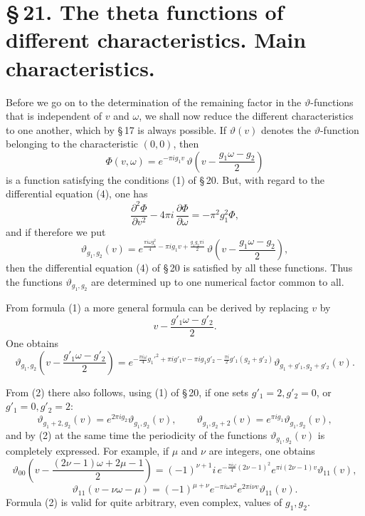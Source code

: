 \documentclass[11pt]{article}
\begin{document}
\section*{\S\,21. The theta functions of different characteristics. Main characteristics.}

Before we go on to the determination of the remaining factor in the $\vartheta$-functions that is independent of $v$ and $\omega$, we shall now reduce the different characteristics to one another, which by \S\,17 is always possible. If $\vartheta(v)$ denotes the $\vartheta$-function belonging to the characteristic $(0,0)$, then
\[
\Phi(v,\omega)=e^{-\pi i g_1 v}\,
\vartheta\!\left(v-\frac{g_1\omega-g_2}{2}\right)
\]
is a function satisfying the conditions (1) of \S\,20. But, with regard to the differential equation (4), one has
\[
\frac{\partial^2\Phi}{\partial v^2}-4\pi i\,\frac{\partial\Phi}{\partial\omega}
=-\pi^2g_1^2\Phi,
\]
and if therefore we put
\begin{equation}
\vartheta_{g_1,g_2}(v)
=e^{\frac{\pi i\omega g_1^2}{4}-\pi i g_1v+\frac{g_1g_2\pi i}{2}}\,
\vartheta\!\left(v-\frac{g_1\omega-g_2}{2}\right),
\tag{1}
\end{equation}
then the differential equation (4) of \S\,20 is satisfied by all these functions. Thus the functions $\vartheta_{g_1,g_2}$ are determined up to one numerical factor common to all.

From formula (1) a more general formula can be derived by replacing $v$ by
\[
v-\frac{g'_1\omega-g'_2}{2}.
\]
One obtains
\begin{equation}
\vartheta_{g_1,g_2}\!\left(v-\frac{g'_1\omega-g'_2}{2}\right)
=e^{-\frac{\pi i\omega}{4}g_1'^2+\pi i g'_1v-\pi i g_1g'_2-\frac{\pi i}{2}g'_1(g_2+g'_2)}
\vartheta_{g_1+g'_1,g_2+g'_2}(v).
\tag{2}
\end{equation}

From (2) there also follows, using (1) of \S\,20, if one sets $g'_1=2,g'_2=0$, or $g'_1=0,g'_2=2$:
\begin{equation}
\vartheta_{g_1+2,g_2}(v)=e^{2\pi i g_2}\vartheta_{g_1,g_2}(v),\qquad
\vartheta_{g_1,g_2+2}(v)=e^{\pi i g_1}\vartheta_{g_1,g_2}(v),
\tag{3}
\end{equation}
and by (2) at the same time the periodicity of the functions $\vartheta_{g_1,g_2}(v)$ is completely expressed. For example, if $\mu$ and $\nu$ are integers, one obtains
\begin{equation}
\vartheta_{00}\!\left(v-\frac{(2\nu-1)\omega+2\mu-1}{2}\right)
=(-1)^{\nu+1}i\,e^{-\frac{\pi i\omega}{4}(2\nu-1)^2}e^{\pi i(2\nu-1)v}\vartheta_{11}(v),
\tag{4}
\end{equation}
\begin{equation}
\vartheta_{11}(v-\nu\omega-\mu)=(-1)^{\mu+\nu}e^{-\pi i\omega\nu^2}e^{2\pi i\nu v}\vartheta_{11}(v).
\tag{5}
\end{equation}
Formula (2) is valid for quite arbitrary, even complex, values of $g_1,g_2$.
\end{document}
